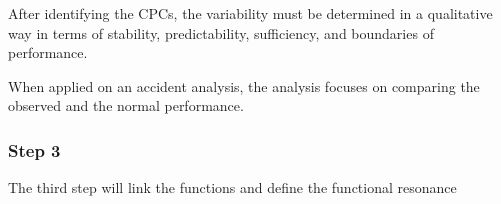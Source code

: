 After identifying the CPCs, the variability must be determined in a qualitative way in terms of stability, predictability, sufficiency, and boundaries of performance. 




When applied on an accident analysis, the analysis focuses on comparing the observed and the normal performance.


\subsubsection*{Step 3}
The third step will link the functions and define the functional resonance


